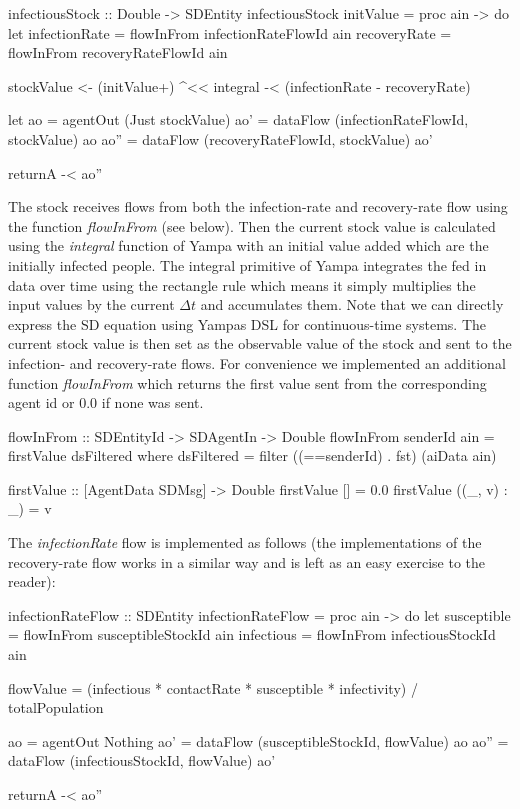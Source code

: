 \begin{HaskellCode}
infectiousStock :: Double -> SDEntity
infectiousStock initValue = proc ain -> do
  let infectionRate = flowInFrom infectionRateFlowId ain
      recoveryRate  = flowInFrom recoveryRateFlowId ain

  stockValue <- (initValue+) ^<< integral -< (infectionRate - recoveryRate)
  
  let ao   = agentOut (Just stockValue)
      ao'  = dataFlow (infectionRateFlowId, stockValue) ao
      ao'' = dataFlow (recoveryRateFlowId, stockValue) ao'
      
  returnA -< ao''
\end{HaskellCode}

The stock receives flows from both the infection-rate and recovery-rate flow using the function \textit{flowInFrom} (see below). Then the current stock value is calculated using the \textit{integral} function of Yampa with an initial value added which are the initially infected people. The integral primitive of Yampa integrates the fed in data over time using the rectangle rule which means it simply multiplies the input values by the current $\Delta t$ and accumulates them. Note that we can directly express the SD equation using Yampas DSL for continuous-time systems. The current stock value is then set as the observable value of the stock and sent to the infection- and recovery-rate flows. For convenience we implemented an additional function \textit{flowInFrom} which returns the first value sent from the corresponding agent id or 0.0 if none was sent.

\begin{HaskellCode}
flowInFrom :: SDEntityId -> SDAgentIn -> Double
flowInFrom senderId ain = firstValue dsFiltered
  where 
    dsFiltered = filter ((==senderId) . fst) (aiData ain)

    firstValue :: [AgentData SDMsg] -> Double
    firstValue [] = 0.0
    firstValue ((_, v) : _) = v
\end{HaskellCode}
	
The \textit{infectionRate} flow is implemented as follows (the implementations of the recovery-rate flow works in a similar way and is left as an easy exercise to the reader):

\begin{HaskellCode}
infectionRateFlow :: SDEntity
infectionRateFlow = proc ain -> do
  let susceptible = flowInFrom susceptibleStockId ain 
      infectious  = flowInFrom infectiousStockId ain

      flowValue   = (infectious * contactRate * susceptible * infectivity) / totalPopulation
  
      ao          = agentOut Nothing
      ao'         = dataFlow (susceptibleStockId, flowValue) ao
      ao''        = dataFlow (infectiousStockId, flowValue) ao'
      
  returnA -< ao''
\end{HaskellCode}

